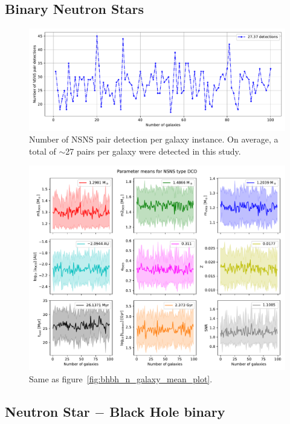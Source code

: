 \subsection{Binary Neutron Stars}
\begin{figure}[!h]
	\centering
    \includegraphics[width=\columnwidth]{analysis_data/004__images_for_latex/NSNS_n_detections}
	\caption{Number of NSNS pair detection per galaxy instance. On average, a total of $\sim$27 pairs per galaxy were detected in this study.}
	\label{fig:nsnsndetections}
\end{figure}

\begin{figure}[!h]
	\centering
    \includegraphics[width=\columnwidth]{analysis_data/004__images_for_latex/NSNS_n_galaxy_mean_plot}
	\caption{Same as figure~\ref{fig:bhbh_n_galaxy_mean_plot}.}
	\label{fig:nsns_n_galaxy_mean_plot}
\end{figure}

\newpage
\subsection{Neutron Star $-$ Black Hole binary}

